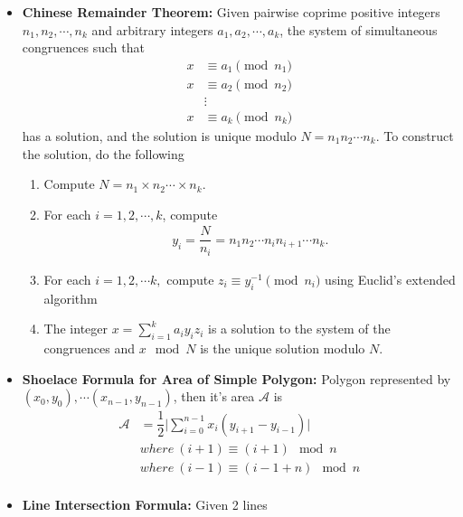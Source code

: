 \documentclass[13pt,a4paper]{article}
\begin{document}
\begin{landscape}
\begin{multicols*}{3}
\begin{itemize}
    \item \textbf{Chinese Remainder Theorem:} Given pairwise coprime positive integers $n_1, n_2, \cdots, n_k$ and arbitrary integers $a_1, a_2, \cdots, a_k$, the system of simultaneous congruences such that
        \begin{align*}
            x &\equiv a_1 \pmod{n_1}\\
            x &\equiv a_2 \pmod{n_2}\\
              &\vdots\\
            x &\equiv a_k \pmod{n_k}
        \end{align*}
    has a solution, and the solution is unique modulo $N = n_1n_2\cdots n_k$.
    To construct the solution, do the following
        \begin{enumerate}
            \item Compute $N = n_1 \times n_2 \cdots \times n_k$.
            \item For each $i = 1, 2,\cdots,k$, compute
                \begin{align*}
                    y_i = \dfrac{N}{n_i} = n_1n_2\cdots n_in_{i + 1}\cdots n_k.
                \end{align*}
            \item For each $i = 1, 2, \cdots k,$ compute $z_i \equiv y_i^{-1} \pmod n_i$ using Euclid's extended algorithm
            \item The integer $x = \sum_{i = 1}^{k} a_iy_iz_i$ is a solution to the system of the congruences and $x \mod{N}$ is the unique solution modulo $N$.
        \end{enumerate}
    \item \textbf{Shoelace Formula for Area of Simple Polygon:} Polygon represented by $(x_0, y_0), \cdots (x_{n - 1}, y_{n - 1})$, then it's area $\mathcal{A}$ is
        \begin{equation*}
        \begin{aligned}
            \mathcal{A} &= \dfrac{1}{2} \bigg|\sum_{i = 0}^{n - 1}x_i(y_{i + 1} - y_{i - 1}) \bigg| \\
                        & where\ (i + 1) \equiv (i + 1) \mod {n}\\
                        & where\ (i - 1) \equiv (i - 1 + n) \mod {n}\\
        \end{aligned}
        \end{equation*}
    \item \textbf{Line Intersection Formula: } Given 2 lines
    \begin{equation*}

\end{equation*}
\end{itemize}
\end{multicols*}
\end{landscape}
\end{document}
